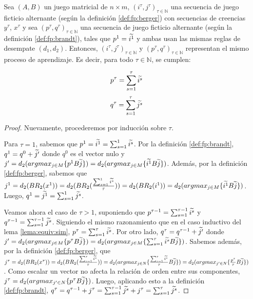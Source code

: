 \begin{lemma}
    Sea $(A, B)$ un juego matricial de $n \times m$, $(i^\tau, j^\tau)_{\tau \in \mathbb{N}}$ una secuencia de juego ficticio alternante (según la definición \ref{def:fp:berger}) con secuencias de creencias $y^\tau$, $x^\tau$ y sea $(p^\tau, q^\tau)_{\tau \in \mathbb{N}}$ una secuencia de juego ficticio alternante (según la definición \ref{def:fp:brandt}), tales que $p^1 = \widetilde{i^1}$ y ambas usan las mismas reglas de desempate $(d_1, d_2)$. Entonces, $(i^\tau, j^\tau)_{\tau \in \mathbb{N}}$ y $(p^\tau, q^\tau)_{\tau \in \mathbb{N}}$ representan el mismo proceso de aprendizaje. Es decir, para todo $\tau \in \mathbb{N}$, se cumplen:

    \[ p^{\tau} = \sum_{s=1}^\tau{\widetilde{i^s}} \]
    \[ q^{\tau} = \sum_{s=1}^\tau{\widetilde{j^s}} \]

\end{lemma}
\begin{proof}
    Nuevamente, procederemos por inducción sobre $\tau$.

    Para $\tau = 1$, sabemos que $p^1 = \widetilde{i^1} = \sum_{s=1}^1{\widetilde{i^s}}$.
    Por la definición \ref{def:fp:brandt}, $q^1 = q^0 + \widetilde{j'}$ donde $q^0$ es el vector nulo y
    $j' = d_2(argmax_{j \in M}\{p^{1}B\widetilde{j}\}) = d_2(argmax_{j \in M}\{\widetilde{i^{1}}B\widetilde{j}\})$.
    Además, por la definición \ref{def:fp:berger}, sabemos que
    $j^1 = d_2(BR_2(x^1)) = d_2(BR_2(\frac{\sum^1_{s=1} \widetilde{i^s}}{\tau})) = d_2(BR_2(i^1)) = d_2(argmax_{j \in M}\{\widetilde{i^{1}}B\widetilde{j}\})$.
    Luego, $q^1 = \widetilde{j^1} = \sum_{s=1}^1{\widetilde{j^s}}$.

    Veamos ahora el caso de $\tau > 1$, suponiendo que
    $p^{\tau-1} = \sum_{s=1}^{\tau-1}{\widetilde{i^s}}$ y $q^{\tau-1} = \sum_{s=1}^{\tau-1}{\widetilde{j^s}}$.
    Siguiendo el mismo razonamiento que en el caso inductivo del lema \ref{lema:equiv:sim},
    $p^{\tau} = \sum_{s=1}^\tau{\widetilde{i^s}}$.
    Por otro lado, $q^{\tau} = q^{\tau-1} + \widetilde{j'}$ donde
    $j' = d_2(argmax_{j \in M}\{p^{\tau}B\widetilde{j}\}) = d_2(argmax_{j \in M}\{\sum_{s=1}^\tau{\widetilde{i^s}}B\widetilde{j}\})$.
    Sabemos además, por la definición \ref{def:fp:berger}, que
    $j^\tau = d_2(BR_2(x^{\tau})) = d_2(BR_2(\frac{\sum_{s=1}^{\tau}{\widetilde{i^s}}}{\tau})) = d_2(argmax_{j \in N}\{\frac{\sum_{s=1}^{\tau}{\widetilde{i^s}}}{\tau}B\widetilde{j}\})  = d_2(argmax_{j' \in N}\{\frac{p^{\tau}}{\tau}B\widetilde{j}\})$.
    Como escalar un vector no afecta la relación de orden entre sus componentes,
    $j^\tau = d_2(argmax_{j' \in N}\{p^{\tau}B\widetilde{j}\})$.
    Luego, aplicando esto a la definición \ref{def:fp:brandt},
    $q^\tau = q^{\tau-1} + j^\tau = \sum_{s=1}^{\tau-1}{\widetilde{j^s}} + j^\tau = \sum_{s=1}^{\tau}{\widetilde{j^s}}$.
\end{proof}

